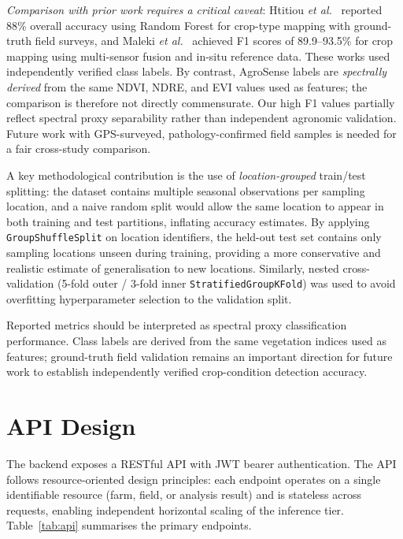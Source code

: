 \documentclass[conference]{IEEEtran}
\begin{document}
\textit{Comparison with prior work requires a critical caveat}: Htitiou
\textit{et al.}~\cite{htitiou2020} reported 88\% overall accuracy using Random
Forest for crop-type mapping with ground-truth field surveys, and Maleki
\textit{et al.}~\cite{maleki2024} achieved F1 scores of 89.9--93.5\% for crop
mapping using multi-sensor fusion and in-situ reference data. These works used
independently verified class labels. By contrast, AgroSense labels are
\textit{spectrally derived} from the same NDVI, NDRE, and EVI values used as
features; the comparison is therefore not directly commensurate. Our high
F1 values partially reflect spectral proxy separability rather than independent
agronomic validation. Future work with GPS-surveyed, pathology-confirmed field
samples is needed for a fair cross-study comparison.

A key methodological contribution is the use of \textit{location-grouped}
train/test splitting: the dataset contains multiple seasonal observations per
sampling location, and a naive random split would allow the same location to
appear in both training and test partitions, inflating accuracy estimates.
By applying \texttt{GroupShuffleSplit} on location identifiers, the held-out
test set contains only sampling locations unseen during training, providing a
more conservative and realistic estimate of generalisation to new locations.
Similarly, nested cross-validation (5-fold outer / 3-fold inner
\texttt{StratifiedGroupKFold}) was used to avoid overfitting hyperparameter
selection to the validation split.

Reported metrics should be interpreted as spectral proxy classification
performance. Class labels are derived from the same vegetation indices used as
features; ground-truth field validation remains an important direction for future
work to establish independently verified crop-condition detection accuracy.

\section{API Design}

The backend exposes a RESTful API with JWT bearer authentication. The API
follows resource-oriented design principles: each endpoint operates on a single
identifiable resource (farm, field, or analysis result) and is stateless across
requests, enabling independent horizontal scaling of the inference tier.
Table~\ref{tab:api} summarises the primary endpoints.
\end{document}
